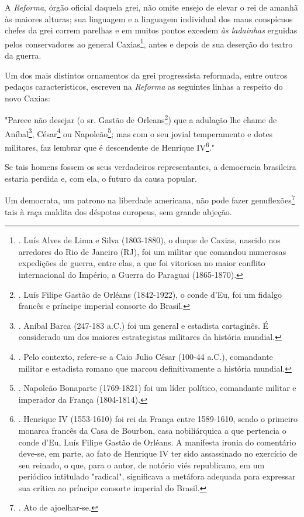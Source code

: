 A \emph{Reforma}, órgão oficial daquela grei, não omite ensejo de elevar
o rei de amanhã às maiores alturas; sua linguagem e a linguagem
individual dos maus conspícuos chefes da grei correm parelhas e em
muitos pontos excedem \emph{às ladainhas} erguidas pelos conservadores
ao general Caxias\footnote{. Luís Alves de Lima e Silva (1803-1880), o
  duque de Caxias, nascido nos arredores do Rio de Janeiro (RJ), foi um
  militar que comandou numerosas expedições de guerra, entre elas, a que
  foi vitoriosa no maior conflito internacional do Império, a Guerra do
  Paraguai (1865-1870).}, antes e depois de sua deserção do teatro da
guerra.

Um dos mais distintos ornamentos da grei progressista reformada, entre
outros pedaços característicos, escreveu na \emph{Reforma} as seguintes
linhas a respeito do novo Caxias:

"Parece não desejar (o sr. Gastão de Orleans\footnote{. Luís Filipe
  Gastão de Orléans (1842-1922), o conde d'Eu, foi um fidalgo francês e
  príncipe imperial consorte do Brasil.}) que a adulação lhe chame de
Aníbal\footnote{. Aníbal Barca (247-183 a.C.) foi um general e estadista
  cartaginês. É considerado um dos maiores estrategistas militares da
  história mundial.}, César\footnote{. Pelo contexto, refere-se a Caio
  Julio César (100-44 a.C.), comandante militar e estadista romano que
  marcou definitivamente a história mundial.} ou Napoleão\footnote{.
  Napoleão Bonaparte (1769-1821) foi um líder político, comandante
  militar e imperador da França (1804-1814).}; mas com o seu jovial
temperamento e dotes militares, faz lembrar que é descendente de
Henrique IV\footnote{. Henrique IV (1553-1610) foi rei da França entre
  1589-1610, sendo o primeiro monarca francês da Casa de Bourbon, casa
  nobiliárquica a que pertencia o conde d'Eu, Luís Filipe Gastão de
  Orléans. A manifesta ironia do comentário deve-se, em parte, ao fato
  de Henrique IV ter sido assassinado no exercício de seu reinado, o
  que, para o autor, de notório viés republicano, em um periódico
  intitulado "radical", significava a metáfora adequada para expressar
  sua crítica ao príncipe consorte imperial do Brasil.}."

Se tais homens fossem os seus verdadeiros representantes, a democracia
brasileira estaria perdida e, com ela, o futuro da causa popular.

Um democrata, um patrono na liberdade americana, não pode fazer
genuflexões\footnote{. Ato de ajoelhar-se.} tais à raça maldita dos
déspotas europeus, sem grande abjeção.

